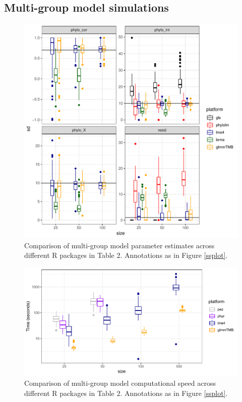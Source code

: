 \documentclass[12pt]{article}
\begin{document}
\subsection*{Multi-group model simulations}

\begin{center}
\begin{figure}[H]
  \includegraphics[scale=0.8,page=4]{./git_push/plot.Rout.pdf}
  \caption{Comparison of multi-group model parameter estimates across different R packages in Table 2. Annotations as in Figure \ref{ssplot}.}
  \label{msplot}
\end{figure}
\end{center}


\begin{center}
\begin{figure}[H]
  \includegraphics[scale=0.8]{./figure/mstime.pdf}
  \caption{Comparison of multi-group model computational speed across different R packages in Table 2. Annotations as in Figure \ref{ssplot}.}
  \label{msplot_time}
\end{figure}
\end{center}
\end{document}
